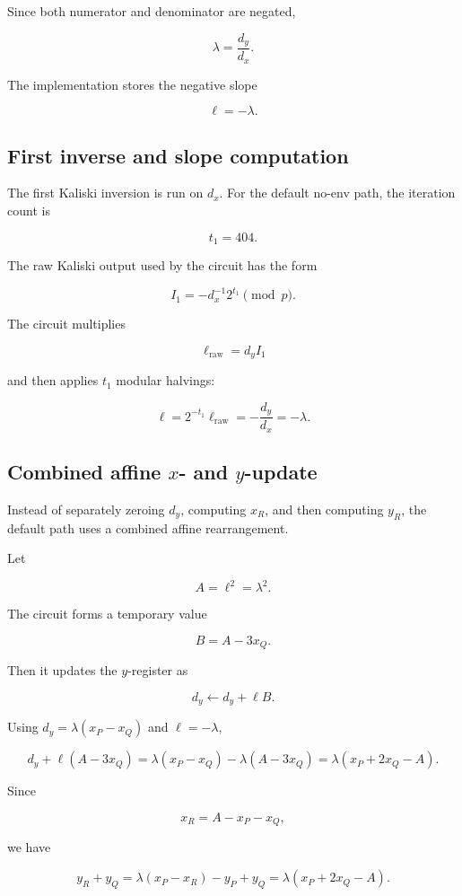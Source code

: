 \documentclass[11pt]{article}
\newcommand{\dx}{d_x}
\newcommand{\dy}{d_y}
\newcommand{\ellv}{\ell}
\begin{document}
Since both numerator and denominator are negated,

\[
\lambda = \frac{\dy}{\dx}.
\]

The implementation stores the negative slope

\[
\ellv = -\lambda.
\]

\subsection{First inverse and slope computation}

The first Kaliski inversion is run on \(\dx\).  For the default no-env path, the
iteration count is

\[
t_1 = 404.
\]

The raw Kaliski output used by the circuit has the form

\[
I_1 = -\dx^{-1}2^{t_1} \pmod p.
\]

The circuit multiplies

\[
\ellv_{\mathrm{raw}} = \dy I_1
\]

and then applies \(t_1\) modular halvings:

\[
\ellv = 2^{-t_1}\ellv_{\mathrm{raw}}
      = -\frac{\dy}{\dx}
      = -\lambda.
\]

\subsection{Combined affine \(x\)- and \(y\)-update}

Instead of separately zeroing \(\dy\), computing \(x_R\), and then computing
\(y_R\), the default path uses a combined affine rearrangement.

Let

\[
A = \ellv^2 = \lambda^2.
\]

The circuit forms a temporary value

\[
B = A - 3x_Q.
\]

Then it updates the \(y\)-register as

\[
\dy \leftarrow \dy + \ellv B.
\]

Using \(\dy=\lambda(x_P-x_Q)\) and \(\ellv=-\lambda\),

\[
\dy + \ellv(A-3x_Q)
=
\lambda(x_P-x_Q)-\lambda(A-3x_Q)
=
\lambda(x_P+2x_Q-A).
\]

Since

\[
x_R = A-x_P-x_Q,
\]

we have

\[
y_R+y_Q
=
\lambda(x_P-x_R)-y_P+y_Q
=
\lambda(x_P+2x_Q-A).
\]
\end{document}

